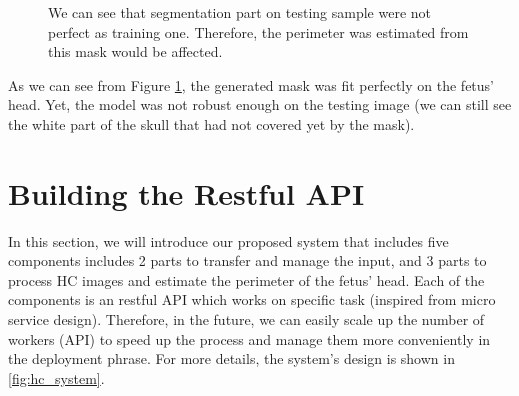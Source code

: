	\begin{figure}[H]
		\centering
		\hfill %
		\hfill %
		\caption{We can see that segmentation part on testing sample were not perfect as training one. Therefore, the perimeter was estimated from this mask would be affected.}
		\label{fig:train_test_result}
	\end{figure}
	
	As we can see from Figure \ref{fig:train_test_result}, the generated mask was fit perfectly on the fetus' head. Yet, the model was not robust enough on the testing image (we can still see the white part of the skull that had not covered yet by the mask).
	
\section{Building the Restful API}
\noindent

	In this section, we will introduce our proposed system that includes five components includes 2 parts to transfer and manage the input, and 3 parts to process HC images and estimate the perimeter of the fetus' head. Each of the components is an restful API which works on specific task (inspired from micro service design). Therefore, in the future, we can easily scale up the number of workers (API) to speed up the process and manage them more conveniently in the deployment phrase. For more details, the system's design is shown in \ref{fig:hc_system}.
	
